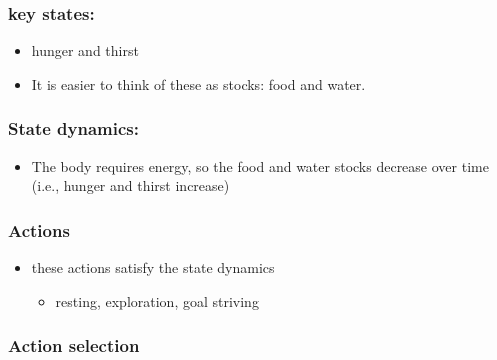 \documentclass[english,,man]{apa6}
\providecommand{\tightlist}{%
  \setlength{\itemsep}{0pt}\setlength{\parskip}{0pt}}
\theoremstyle{definition}
\theoremstyle{definition}
\theoremstyle{definition}
\theoremstyle{remark}
\begin{document}
\hypertarget{key-states-1}{%
\subsubsection{key states:}\label{key-states-1}}

\begin{itemize}
\tightlist
\item
  hunger and thirst
\item
  It is easier to think of these as stocks: food and water.
\end{itemize}

\hypertarget{state-dynamics-1}{%
\subsubsection{State dynamics:}\label{state-dynamics-1}}

\begin{itemize}
\tightlist
\item
  The body requires energy, so the food and water stocks decrease over
  time (i.e., hunger and thirst increase)
\end{itemize}

\hypertarget{actions-1}{%
\subsubsection{Actions}\label{actions-1}}

\begin{itemize}
\item
  these actions satisfy the state dynamics

  \begin{itemize}
  \tightlist
  \item
    resting, exploration, goal striving
  \end{itemize}
\end{itemize}

\hypertarget{action-selection-1}{%
\subsubsection{Action selection}\label{action-selection-1}}
\end{document}

